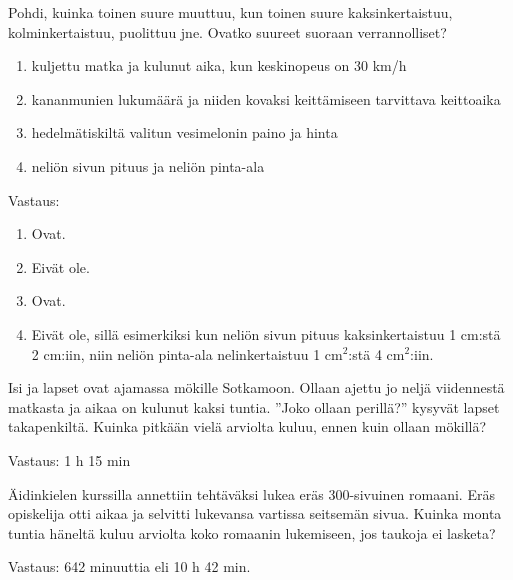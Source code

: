 \begin{tehtava}
    Pohdi, kuinka toinen suure muuttuu, kun toinen suure kaksinkertaistuu,
    kolminkertaistuu, puolittuu jne. Ovatko suureet suoraan verrannolliset?
    
    \begin{enumerate}
        \item kuljettu matka ja kulunut aika, kun keskinopeus on 30 km/h
        \item kananmunien lukumäärä ja niiden kovaksi keittämiseen tarvittava keittoaika
        \item hedelmätiskiltä valitun vesimelonin paino ja hinta
        \item neliön sivun pituus ja neliön pinta-ala
    \end{enumerate}
    
    \begin{vastaus}
        Vastaus:
        \begin{enumerate}
            \item Ovat.
            \item Eivät ole.
            \item Ovat.
            \item Eivät ole, sillä esimerkiksi kun neliön sivun pituus
                kaksinkertaistuu 1 cm:stä 2 cm:iin, niin neliön pinta-ala
                nelinkertaistuu 1 cm$^2$:stä 4 cm$^2$:iin.
        \end{enumerate}
    \end{vastaus}
\end{tehtava}

\begin{tehtava}
    Isi ja lapset ovat ajamassa mökille Sotkamoon. Ollaan ajettu jo neljä
    viidennestä matkasta ja aikaa on kulunut kaksi tuntia. ''Joko ollaan perillä?''
    kysyvät lapset takapenkiltä. Kuinka pitkään vielä arviolta kuluu, ennen
    kuin ollaan mökillä?
    
    \begin{vastaus}
        Vastaus: 1 h 15 min
    \end{vastaus}
\end{tehtava}

\begin{tehtava}
    Äidinkielen kurssilla annettiin tehtäväksi lukea eräs 300-sivuinen romaani.
    Eräs opiskelija otti aikaa ja selvitti lukevansa vartissa seitsemän sivua.
    Kuinka monta tuntia häneltä kuluu arviolta koko romaanin lukemiseen, jos
    taukoja ei lasketa?
    
    \begin{vastaus}
        Vastaus: 642 minuuttia eli 10 h 42 min.
    \end{vastaus}
\end{tehtava}

